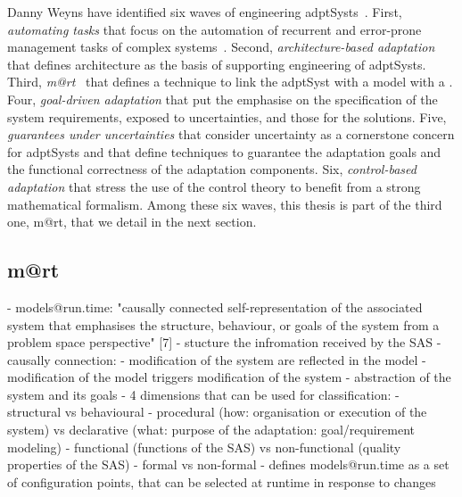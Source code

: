 Danny Weyns have identified six waves of engineering \glspl{adptSyst}~\cite{DBLP:books/sp/19/Weyns19}.
First, \textit{automating tasks} that focus on the automation of recurrent and error-prone management tasks of complex systems~\cite{DBLP:journals/computer/KephartC03}.
Second, \textit{architecture-based adaptation} that defines architecture as the basis of supporting engineering of \glspl{adptSyst}. 
Third, \textit{\gls{m@rt}}~\cite{DBLP:journals/computer/BlairBF09, DBLP:journals/computer/MorinBJFS09} that defines a technique to link the \gls{adptSyst} with a model with a .
Four, \textit{goal-driven adaptation} that put the emphasise on the specification of the system requirements, exposed to uncertainties, and those for the solutions.
Five, \textit{guarantees under uncertainties} that consider uncertainty as a cornerstone concern for \glspl{adptSyst} and that define techniques to guarantee the adaptation goals and the functional correctness of the adaptation components.
Six, \textit{control-based adaptation} that stress the use of the control theory to benefit from a strong mathematical formalism.
Among these six waves, this thesis is part of the third one, \gls{m@rt}, that we detail in the next section.


\subsection[Models@run.time]{\Gls{m@rt}}

- models@run.time: "causally connected self-representation of the associated system that emphasises the structure, behaviour, or goals of the system from a problem space perspective" [7]
    - stucture the infromation received by the SAS
    - causally connection:
        - modification of the system are reflected in the model
        - modification of the model triggers modification of the system
    - abstraction of the system and its goals
    - 4 dimensions that can be used for classification:
        - structural vs behavioural
        - procedural (how: organisation or execution of the system) vs declarative (what: purpose of the adaptation: goal/requirement modeling)
        - functional (functions of the SAS) vs non-functional (quality properties of the SAS)
        - formal vs non-formal
    - \cite{DBLP:journals/computer/MorinBJFS09} defines models@run.time as a set of configuration points, that can be selected at runtime in response to changes

